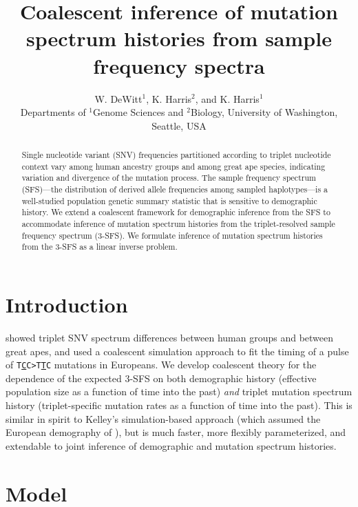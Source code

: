 \documentclass[11pt]{article}
\title{Coalescent inference of mutation spectrum histories from sample frequency spectra}
\author{
W. DeWitt$^{1}$, K. Harris$^{2}$, and K. Harris$^{1}$\\
\small{Departments of $^1$Genome Sciences and $^2$Biology, University of Washington, Seattle, USA}
}
\begin{document}
\maketitle

\begin{abstract}

Single nucleotide variant (SNV) frequencies partitioned according to triplet nucleotide context vary among human ancestry groups and among great ape species, indicating variation and divergence of the mutation process.
The sample frequency spectrum (SFS)---the distribution of derived allele frequencies among sampled haplotypes---is a well-studied population genetic summary statistic that is sensitive to demographic history.
We extend a coalescent framework for demographic inference from the SFS to accommodate inference of mutation spectrum histories from the triplet-resolved sample frequency spectrum (3-SFS).
We formulate inference of mutation spectrum histories from the 3-SFS as a linear inverse problem.

\end{abstract}


\section{Introduction}\label{sec:intro}

\cite{Harris2017-fw} showed triplet SNV spectrum differences between human groups and between great apes, and used a coalescent simulation approach to fit the timing of a pulse of \texttt{T\underline{C}C>T\underline{T}C} mutations in Europeans.
We develop coalescent theory for the dependence of the expected 3-SFS on both demographic history (effective population size as a function of time into the past) \emph{and} triplet mutation spectrum history (triplet-specific mutation rates as a function of time into the past).
This is similar in spirit to Kelley's simulation-based approach (which assumed the European demography of \cite{Tennessen2012-dq}), but is much faster, more flexibly parameterized, and extendable to joint inference of demographic and mutation spectrum histories.

\section{Model}\label{sec:model}
\end{document}
